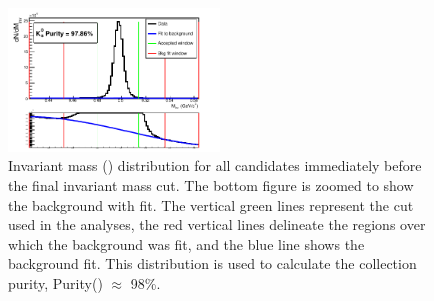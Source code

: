 \documentclass[../AnalysisNoteJBuxton.tex]{subfiles}
\begin{document}
\begin{figure}[h]
  \centering
  \includegraphics[width=0.5\textwidth]{3_DataSelection/Figures/K0Purity_LamK0.pdf}
  \caption[\Ks Purity]{Invariant mass (\minv) distribution for all \Ks candidates immediately before the final invariant mass cut.  The bottom figure is zoomed to show the background with fit.  The vertical green lines represent the \minv cut used in the analyses, the red vertical lines delineate the regions over which the background was fit, and the blue line shows the background fit.  This distribution is used to calculate the collection purity, Purity(\Ks) $\approx$ 98\%.}
  \label{fig:K0Purity}
\end{figure}
\end{document}
